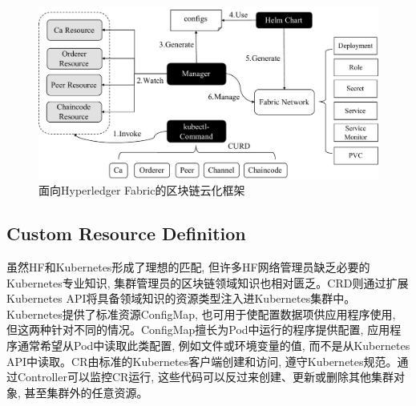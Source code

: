 \begin{figure}[h] %
    \centering %
    \includegraphics[width=1.0\textwidth]{FIGs/chapter5/framework.pdf} %
    \caption{面向Hyperledger Fabric的区块链云化框架} %
    \label{framework} %
\end{figure}%

\subsection{Custom Resource Definition}\label{section: Custom_Resource_Definition}

虽然HF和Kubernetes形成了理想的匹配, 但许多HF网络管理员缺乏必要的Kubernetes专业知识, 集群管理员的区块链领域知识也相对匮乏。CRD则通过扩展Kubernetes API将具备领域知识的资源类型注入进Kubernetes集群中。Kubernetes提供了标准资源ConfigMap, 也可用于使配置数据项供应用程序使用, 但这两种针对不同的情况。ConfigMap擅长为Pod中运行的程序提供配置, 应用程序通常希望从Pod中读取此类配置, 例如文件或环境变量的值, 而不是从Kubernetes API中读取。CR由标准的Kubernetes客户端创建和访问, 遵守Kubernetes规范。通过Controller可以监控CR运行, 这些代码可以反过来创建、更新或删除其他集群对象, 甚至集群外的任意资源。


